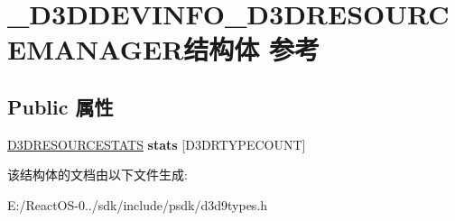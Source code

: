 \hypertarget{struct___d3_d_d_e_v_i_n_f_o___d3_d_r_e_s_o_u_r_c_e_m_a_n_a_g_e_r}{}\section{\+\_\+\+D3\+D\+D\+E\+V\+I\+N\+F\+O\+\_\+\+D3\+D\+R\+E\+S\+O\+U\+R\+C\+E\+M\+A\+N\+A\+G\+E\+R结构体 参考}
\label{struct___d3_d_d_e_v_i_n_f_o___d3_d_r_e_s_o_u_r_c_e_m_a_n_a_g_e_r}
\subsection*{Public 属性}
\begin{DoxyCompactItemize}
\item 
\mbox{\label{struct___d3_d_d_e_v_i_n_f_o___d3_d_r_e_s_o_u_r_c_e_m_a_n_a_g_e_r_a24d57d71477e3e63d7a50e005401bd6c}} 
\hyperlink{struct_d3_d_r_e_s_o_u_r_c_e_s_t_a_t_s}{D3\+D\+R\+E\+S\+O\+U\+R\+C\+E\+S\+T\+A\+TS} {\bfseries stats} \mbox{[}D3\+D\+R\+T\+Y\+P\+E\+C\+O\+U\+NT\mbox{]}
\end{DoxyCompactItemize}


该结构体的文档由以下文件生成\+:\begin{DoxyCompactItemize}
\item 
E\+:/\+React\+O\+S-\/0../sdk/include/psdk/d3d9types.\+h\end{DoxyCompactItemize}
